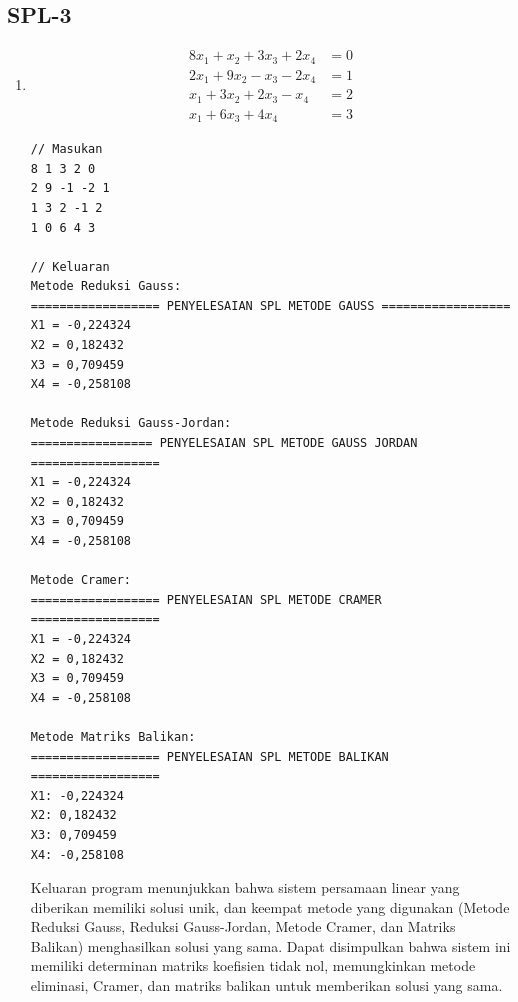 \subsection{SPL-3}
\begin{enumerate}[label=(\alph*)]
    \item 
\begin{align*}
    8x_1 + x_2 + 3x_3 + 2x_4 &= 0 \\
    2x_1 + 9x_2 - x_3 - 2x_4 &= 1 \\
    x_1 + 3x_2 + 2x_3 - x_4 &= 2 \\
    x_1 + 6x_3 + 4x_4 &= 3
\end{align*}

\begin{lstlisting}[caption = spl-3a.txt]
// Masukan
8 1 3 2 0
2 9 -1 -2 1
1 3 2 -1 2
1 0 6 4 3

// Keluaran
Metode Reduksi Gauss:
================== PENYELESAIAN SPL METODE GAUSS ==================
X1 = -0,224324
X2 = 0,182432
X3 = 0,709459
X4 = -0,258108

Metode Reduksi Gauss-Jordan:
================= PENYELESAIAN SPL METODE GAUSS JORDAN ==================
X1 = -0,224324
X2 = 0,182432
X3 = 0,709459
X4 = -0,258108

Metode Cramer:
================== PENYELESAIAN SPL METODE CRAMER ==================
X1 = -0,224324
X2 = 0,182432
X3 = 0,709459
X4 = -0,258108

Metode Matriks Balikan:
================== PENYELESAIAN SPL METODE BALIKAN ==================
X1: -0,224324
X2: 0,182432
X3: 0,709459
X4: -0,258108\end{lstlisting}

Keluaran program menunjukkan bahwa sistem persamaan linear yang diberikan memiliki solusi unik, dan keempat metode yang digunakan (Metode Reduksi Gauss, Reduksi Gauss-Jordan, Metode Cramer, dan Matriks Balikan) menghasilkan solusi yang sama. Dapat disimpulkan bahwa sistem ini memiliki determinan matriks koefisien tidak nol, memungkinkan metode eliminasi, Cramer, dan matriks balikan untuk memberikan solusi yang sama.


\end{enumerate}
